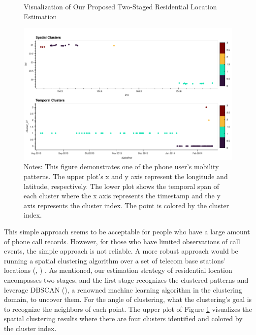 \vspace{0.3cm}
\begin{figure}[h!]
\centering
\caption{Visualization of Our Proposed Two-Staged Residential Location Estimation}
\vspace{0.1cm}

\includegraphics[width=1\textwidth]{figures/cluster_res.png}

\vspace{0.1cm}
\caption*{Notes:  This figure demonstrates one of the phone user's mobility patterns. The upper plot's x and y axis represent the longitude and latitude, respectively. The lower plot shows the temporal span of each cluster where the x axis represents the timestamp and the y axis represents the cluster index. The point is colored by the cluster index.}
\label{fig:cluster}
\end{figure}


This simple approach seems to be acceptable for people who have a large amount of phone call records. However, for those who have limited observations of call events, the simple approach is not reliable. A more robust approach would be running a spatial clustering algorithm over a set of telecom base stations' locations (\cite{isaacman2011identifying}, \cite{yang2014identifying}) . As mentioned, our estimation strategy of residential location encompasses two stages, and the first stage recognizes the clustered patterns and leverage DBSCAN (\cite{ester1996density}), a renowned machine learning algorithm in the clustering domain, to uncover them. For the angle of clustering, what the clustering's goal is to recognize the neighbors of each point. The upper plot of Figure \ref{fig:cluster} visualizes the spatial clustering results where there are four clusters identified and colored by the cluster index.


